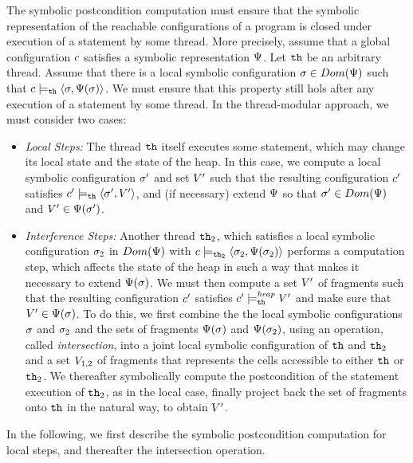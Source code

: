 The symbolic postcondition computation must ensure that the symbolic representation
of the reachable configurations of a program is closed under execution of a
statement by some thread.
More precisely, assume that a global configuration $c$ satisfies
a symbolic representation $\Psi$. Let ${\tt th}$ be an arbitrary thread.
Assume that there is
a local symbolic configuration $\sigma \in Dom(\Psi)$ such that
$c \models_{{\tt th}} \left\langle\sigma,\Psi(\sigma)\right\rangle$.
We must ensure that this property still hols after any execution of a
statement by some thread.
In the thread-modular approach, we must consider two cases:
\begin{itemize}
\item
  {\it Local Steps:} The thread ${\tt th}$ itself executes some statement,
  which may change its local state and the state of the heap.
  In this case, we compute a local symbolic configuration $\sigma'$ and
  set $V'$ such that the resulting configuration $c'$ satisfies
  $c' \models_{{\tt th}} \left\langle\sigma',V'\right\rangle$, and (if necessary)
  extend $\Psi$ so that $\sigma' \in Dom(\Psi)$ and
  $V' \in \Psi(\sigma')$.
\item
  {\it Interference Steps:} Another thread ${\tt th}_2$, which 
  satisfies a local symbolic configuration $\sigma_2$
  in $Dom(\Psi)$ with
  $c \models_{{\tt th}_2} \left\langle\sigma_2,\Psi(\sigma_2)\right\rangle$
  performs a computation step,  which affects the state of the heap in
  such a way that makes it necessary to extend $\Psi(\sigma)$.
  We must then compute a set $V'$ of fragments such that
  the resulting configuration $c'$ satisfies
  $c' \models_{{\tt th}}^{\mathit{heap}} V'$ and 
  make sure that $V' \in \Psi(\sigma)$.
  To do this, we first combine the the local symbolic configurations
  $\sigma$ and $\sigma_2$ and the sets of fragments
  $\Psi(\sigma)$ and $\Psi(\sigma_2)$, using an
  operation, called {\em intersection}, into
  a joint local symbolic configuration of ${\tt th}$ and ${\tt th}_2$ and
  a set $V_{1,2}$ of fragments that represents the cells accessible
  to either ${\tt th}$ or ${\tt th}_2$.
  We thereafter symbolically compute the postcondition of the statement
  execution of ${\tt th}_2$, as in the local case, finally project back the
  set of fragments onto ${\tt th}$ in the natural way, to obtain $V'$.
\end{itemize}
In the following, we first describe the symbolic postcondition computation for
local steps, and thereafter the intersection operation.


